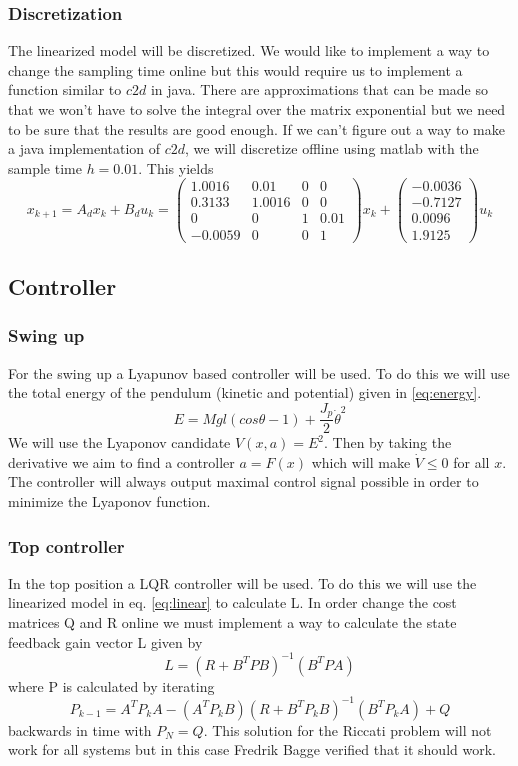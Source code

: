 \documentclass[10pt,a4paper]{article}
\begin{document}
\subsubsection{Discretization}
The linearized model will be discretized. We would like to implement a way to change the sampling time online but this would require us to implement a function similar to $c2d$ in java. There are approximations that can be made so that we won't have to solve the integral over the matrix exponential but we need to be sure that the results are good enough. If we can't figure out a way to make a java implementation of $c2d$, we will discretize offline using matlab with the sample time $h=0.01$.
This yields
\begin{equation}
x_{k+1} = A_dx_k + B_du_k =\begin{pmatrix}
 1.0016 & 0.01 & 0 & 0 \\
 0.3133 & 1.0016 & 0 & 0 \\
 0 & 0 & 1 & 0.01 \\
 -0.0059 & 0 & 0 & 1 
\end{pmatrix}x_k + \begin{pmatrix}
-0.0036\\
-0.7127\\
 0.0096\\
 1.9125
 \end{pmatrix}u_k
 \label{eq:discrete}
\end{equation}

\subsection{Controller}
\subsubsection{Swing up}
For the swing up a Lyapunov based controller will be used. To do this we will use the total energy of the pendulum (kinetic and potential) given in \ref{eq:energy}.
\begin{equation}
E= Mgl(cos\theta - 1)+\frac{J_p}{2}\dot\theta^2
\label{eq:energy}
\end{equation}
We will use the Lyaponov candidate $V(x,a)=E^2$. Then by taking the derivative we aim to find a controller $a=F(x)$ which will make $\dot V \leq 0$ for all $x$. The controller will always output maximal control signal possible in order to minimize the Lyaponov function.
\subsubsection{Top controller}
In the top position a LQR controller will be used. To do this we will use the linearized model in eq. \ref{eq:linear} to calculate L. In order change the cost matrices Q and R online we must implement a way to calculate the state feedback gain vector L given by
$$ L = (R+B^TPB)^{-1}(B^TPA) $$
where P is calculated by iterating
$$ P_{k-1} = A^TP_kA-(A^TP_kB)(R+B^TP_kB)^{-1}(B^TP_kA)+Q $$
backwards in time with $P_N = Q$. This solution for the Riccati problem will not work for all systems but in this case Fredrik Bagge verified that it should work.
\end{document}
